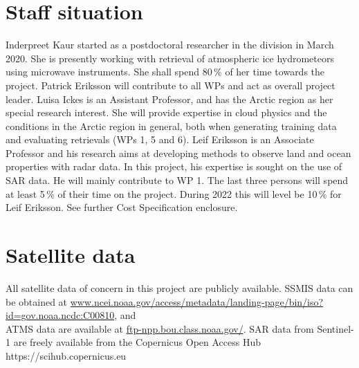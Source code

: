 \documentclass[12pt,oneside,a4paper]{article}
\begin{document}
\section{Staff situation}
%
\label{sec:staff}
Inderpreet Kaur started as a postdoctoral researcher in the division in March
2020. She is presently working with retrieval of atmospheric ice hydrometeors
using microwave instruments. She shall spend 80\,\% of her time towards the
project. Patrick Eriksson will contribute to all WPs and act as overall project
leader. Luisa Ickes is an Assistant Professor, and has the Arctic region as her
special research interest. She will provide expertise in cloud physics and the
conditions in the Arctic region in general, both when generating training data
and evaluating retrievals (WPs 1, 5 and 6). Leif Eriksson is an Associate
Professor and his research aims at developing methods to observe land and ocean
properties with radar data. In this project, his expertise is sought on the use
of SAR data. He will mainly contribute to WP 1. The
last three persons will spend at least 5\,\% of their time on the project.
During 2022 this will level be 10\,\% for Leif Eriksson. See further Cost
Specification enclosure.


\section{Satellite data}
%
All satellite data of concern in this project are publicly available. SSMIS
data can be obtained at
\url{www.ncei.noaa.gov/access/metadata/landing-page/bin/iso?id=gov.noaa.ncdc:C00810},
and\\ATMS data are available at \url{ftp-npp.bou.class.noaa.gov/}. SAR data from Sentinel-1 are freely  available from the Copernicus Open Access Hub https://scihub.copernicus.eu

{\footnotesize
	
}
\end{document}
